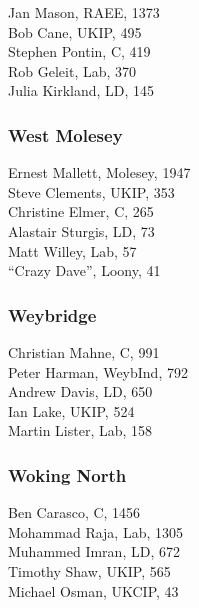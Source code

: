 \documentclass[a4paper,openany,10pt]{book}
\begin{document}


Jan Mason, RAEE, 1373\\
Bob Cane, UKIP, 495\\
Stephen Pontin, C, 419\\
Rob Geleit, Lab, 370\\
Julia Kirkland, LD, 145\\


\subsubsection*{West Molesey}



Ernest Mallett, Molesey, 1947\\
Steve Clements, UKIP, 353\\
Christine Elmer, C, 265\\
Alastair Sturgis, LD, 73\\
Matt Willey, Lab, 57\\
``Crazy Dave'', Loony, 41\\


\subsubsection*{Weybridge}



Christian Mahne, C, 991\\
Peter Harman, WeybInd, 792\\
Andrew Davis, LD, 650\\
Ian Lake, UKIP, 524\\
Martin Lister, Lab, 158\\


\subsubsection*{Woking North}



Ben Carasco, C, 1456\\
Mohammad Raja, Lab, 1305\\
Muhammed Imran, LD, 672\\
Timothy Shaw, UKIP, 565\\
Michael Osman, UKCIP, 43\\
\end{document}
